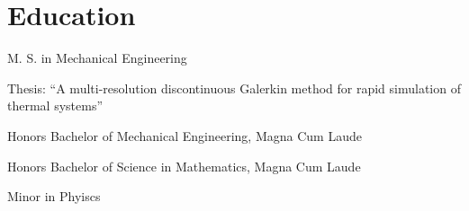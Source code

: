 \section{Education}
%
\begin{position}
  \begin{myitem}
  \item M. S. in Mechanical Engineering
  \item Thesis: ``A multi-resolution discontinuous Galerkin method for rapid simulation of thermal systems''
  \end{myitem}
  \begin{myitem}
  \item Honors Bachelor of Mechanical Engineering, Magna Cum Laude
  \item Honors Bachelor of Science in Mathematics, Magna Cum Laude
  \item Minor in Phyiscs
%
%
  \end{myitem}
\end{position}
